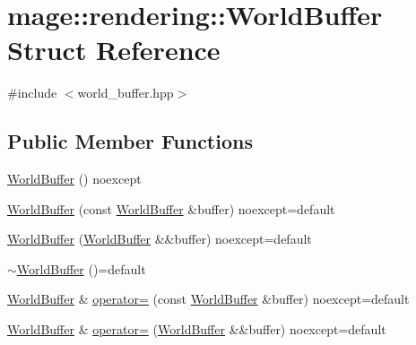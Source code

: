 \hypertarget{structmage_1_1rendering_1_1_world_buffer}{}\section{mage\+:\+:rendering\+:\+:World\+Buffer Struct Reference}
\label{structmage_1_1rendering_1_1_world_buffer}


{\ttfamily \#include $<$world\+\_\+buffer.\+hpp$>$}

\subsection*{Public Member Functions}
\begin{DoxyCompactItemize}
\item 
\hyperlink{structmage_1_1rendering_1_1_world_buffer_a7f51349a6ffa759e245230fa26eaf318}{World\+Buffer} () noexcept
\item 
\hyperlink{structmage_1_1rendering_1_1_world_buffer_a70a1f1b062c0548f2ff87db8d78749f2}{World\+Buffer} (const \hyperlink{structmage_1_1rendering_1_1_world_buffer}{World\+Buffer} \&buffer) noexcept=default
\item 
\hyperlink{structmage_1_1rendering_1_1_world_buffer_ab5cce49c9fe1bbe5e7db5f98df3dbf1a}{World\+Buffer} (\hyperlink{structmage_1_1rendering_1_1_world_buffer}{World\+Buffer} \&\&buffer) noexcept=default
\item 
\hyperlink{structmage_1_1rendering_1_1_world_buffer_afdfdecc619400706fa89e24f3ce14a43}{$\sim$\+World\+Buffer} ()=default
\item 
\hyperlink{structmage_1_1rendering_1_1_world_buffer}{World\+Buffer} \& \hyperlink{structmage_1_1rendering_1_1_world_buffer_a0a776f3c84577f8530cf5932274cd8c9}{operator=} (const \hyperlink{structmage_1_1rendering_1_1_world_buffer}{World\+Buffer} \&buffer) noexcept=default
\item 
\hyperlink{structmage_1_1rendering_1_1_world_buffer}{World\+Buffer} \& \hyperlink{structmage_1_1rendering_1_1_world_buffer_a3fcc219d1410d858cc3b15f1cac5da9a}{operator=} (\hyperlink{structmage_1_1rendering_1_1_world_buffer}{World\+Buffer} \&\&buffer) noexcept=default
\end{DoxyCompactItemize}
